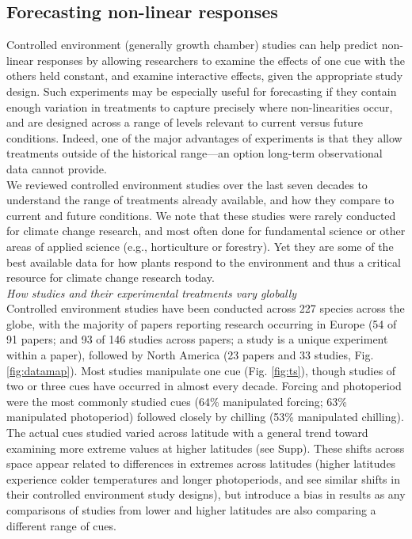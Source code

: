 \documentclass[11pt,letter]{article}
\begin{document}
\subsection{Forecasting non-linear responses} %
Controlled environment (generally growth chamber) studies can help predict non-linear responses by allowing researchers to examine the effects of one cue with the others held constant, and examine interactive effects, given the appropriate study design. Such experiments may be especially useful for forecasting if they contain enough variation in treatments to capture precisely where non-linearities occur, and are designed across a range of levels relevant to current versus future conditions. Indeed, one of the major advantages of experiments is that they allow treatments outside of the historical range---an option long-term observational data cannot provide. \\

We reviewed controlled environment studies over the last seven decades to understand the range of treatments already available, and how they compare to current and future conditions. We note that these studies were rarely conducted for climate change research, and most often done for fundamental science or other areas of applied science (e.g., horticulture or forestry). Yet they are some of the best available data for how plants respond to the environment and thus a critical resource for climate change research today.\\

\emph{How studies and their experimental treatments vary globally}\\
Controlled environment studies have been conducted across 227 species across the globe, with the majority of papers reporting research occurring in Europe (54 of 91 papers; and 93 of 146 studies across papers; a study is a unique experiment within a paper), followed by North America (23 papers and 33 studies, Fig. \ref{fig:datamap}). Most studies manipulate one cue (Fig. \ref{fig:ts}), though studies of two or three cues have occurred in almost every decade. Forcing and photoperiod were the most commonly studied cues (64\% manipulated forcing; 63\% manipulated photoperiod) followed closely by chilling (53\% manipulated chilling). The actual cues studied varied across latitude with a general trend toward examining more extreme values at higher latitudes (see Supp). These shifts across space appear related to differences in extremes across latitudes (higher latitudes experience colder temperatures and longer photoperiods, and see similar shifts in their controlled environment study designs), but introduce a bias in results as any comparisons of studies from lower and higher latitudes are also comparing a different range of cues. \\
\end{document}
